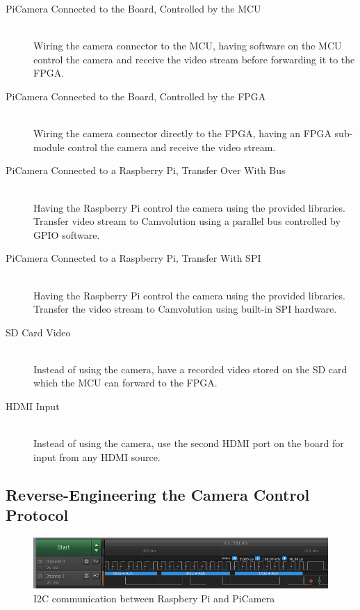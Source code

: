 \begin{description}
    \item[PiCamera Connected to the Board, Controlled by the MCU]
        \hfill\\
        Wiring the camera connector to the MCU, having software on the MCU control the camera and receive the video stream before forwarding it to the FPGA.
    \item[PiCamera Connected to the Board, Controlled by the FPGA]
        \hfill\\
        Wiring the camera connector directly to the FPGA, having an FPGA sub-module control the camera and receive the video stream.
    \item[PiCamera Connected to a Raspberry Pi, Transfer Over With Bus]
        \hfill\\
        Having the Raspberry Pi control the camera using the provided libraries.
        Transfer video stream to Camvolution using a parallel bus controlled by GPIO software.
    \item[PiCamera Connected to a Raspberry Pi, Transfer With SPI]
        \hfill\\
        Having the Raspberry Pi control the camera using the provided libraries.
        Transfer the video stream to Camvolution using built-in SPI hardware.
    \item[SD Card Video]
        \hfill\\
        Instead of using the camera, have a recorded video stored on the SD card which the MCU can forward to the FPGA.
    \item[HDMI Input]
        \hfill\\
        Instead of using the camera, use the second HDMI port on the board for input from any HDMI source.
\end{description}

\subsection{Reverse-Engineering the Camera Control Protocol}
\begin{figure}
    \centering
    \includegraphics[width=\linewidth]{img/logic/pi_cam_i2c}
    \caption{I2C communication between Raspbery Pi and PiCamera}
    \label{fig:PiCamI2C}
\end{figure}

